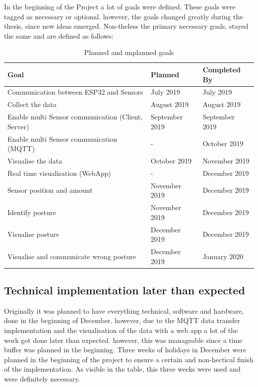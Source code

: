 In the beginning of the Project a lot of goals were defined. These goals were tagged as necessary or optional. however, the goals changed greatly during the thesis, since new ideas emerged. Non-theless the primary necessary goals, stayed the same and are defined as follows: 
\renewcommand{\thetable}{\arabic{table}}
\begin{center}
\begin{table}[h!]
\begin{tabular}{|p{9cm}|p{3cm}|p{3cm}|}
  \hline
 \textbf{Goal} &\textbf{ Planned  } &\textbf{ Completed By } \\ 
  \hline
 Communication between ESP32 and Sensors & July 2019 & July 2019   \\  
 \hline
 Collect the data  & August 2019  & August 2019   \\  
  \hline
 Enable multi Sensor communication (Client, Server) & September 2019 & September 2019   \\ 
  \hline
 Enable multi Sensor communication (MQTT) & - & October 2019   \\ 
  \hline
 Visualise the data & October 2019 & November 2019   \\  
  \hline
 Real time visualisation (WebApp) & - & December 2019   \\  
   \hline
 Sensor position and amount & November 2019 & December 2019   \\ 
  \hline
 Identify posture & November 2019 & December 2019   \\  
  \hline
 Visualise posture & December 2019 &  December 2019 \\    
   \hline
 Visualise and communicate wrong posture & December 2019& January 2020 \\    
  \hline
\end{tabular}
\caption{Planned and unplanned goals}
\label{table:1}
\end{table}
\end{center}

\subsection{Technical implementation later than expected}

Originally it was planned to have everything technical, software and hardware, done in the beginning of December. however, due to the MQTT data transfer implementation and the visualisation of the data with a web app a lot of the work got done later than expected. however, this was manageable since a time buffer was planned in the beginning. Three weeks of holidays in December were planned in the beginning of the project to ensure a certain and non-hectical finish of the implementation. As visible in the table, this three weeks were used and were definitely necessary. 

